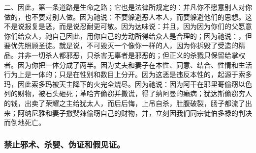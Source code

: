 二、因此，第一条道路是生命之路；它也是法律所规定的：并凡你不愿意别人对你做的，也不要对别人做。因为祂说：不要躲避恶人本人，而要躲避他们的思想。这不是说报复是恶，而是说忍耐更可敬。因为达味说：并且，因为因为你们的父愿意你们给众人，祂自己因此，用你自己的劳动所得给众人是合理的；因为祂说：，但要优先照顾圣徒。就是说，不可毁灭一个像你一样的人，因为你拆毁了受造的精品。并非一切杀人都邪恶，只杀害无辜者是邪恶的；但正义的杀戮只保留给掌权者。因为你把一体分成了两半。因为丈夫和妻子在本性、同意、结合、性情和生活行为上是一体的；只是在性别和数目上分开。因为这恶是违反本性的，起源于索多玛，因此索多玛被天主降下的火完全烧尽。因为祂说：因为阿干在耶里哥偷窃以色列的财物，被石头砸死；革哈齐偷窃并撒谎，得了纳阿曼的癞病；犹达斯偷窃穷人的钱，出卖了荣耀之主给犹太人，而后后悔，上吊自杀，肚腹破裂，肠子都流了出来；阿纳尼雅和妻子撒斐辣偷窃自己的财物，并，立刻因我们同宗徒伯多禄的判决而倒地死亡。\par


\subsubsection{禁止邪术、杀婴、伪证和假见证。}

